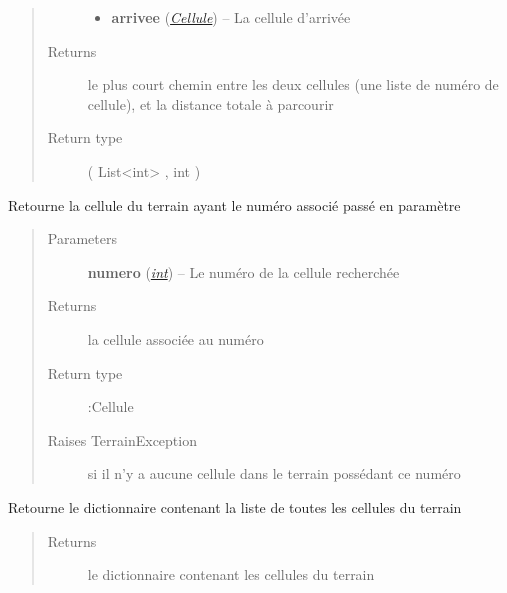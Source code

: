 \documentclass[letterpaper,10pt,english]{sphinxmanual}
\begin{document}
\begin{fulllineitems}
\begin{fulllineitems}
\begin{quote}
\begin{description}
\begin{itemize}
\item {} 
\textbf{arrivee} ({\hyperref[index:module-Cellule]{\emph{Cellule}}}) -- La cellule d'arrivée

\end{itemize}

\item[{Returns}] \leavevmode
le plus court chemin entre les deux cellules (une liste de numéro de cellule), et la distance totale à parcourir

\item[{Return type}] \leavevmode
( List\textless{}int\textgreater{} , int )

\end{description}\end{quote}

\end{fulllineitems}


\begin{fulllineitems}
\label{index:Terrain.Terrain.getCellule}
Retourne la cellule du terrain ayant le numéro associé passé en paramètre
\begin{quote}\begin{description}
\item[{Parameters}] \leavevmode
\textbf{numero} (\href{http://docs.python.org/library/functions.html\#int}{\emph{int}}) -- Le numéro de la cellule recherchée

\item[{Returns}] \leavevmode
la cellule associée au numéro

\item[{Return type}] \leavevmode
:Cellule

\item[{Raises TerrainException}] \leavevmode
si il n'y a aucune cellule dans le terrain possédant ce numéro

\end{description}\end{quote}

\end{fulllineitems}


\begin{fulllineitems}
\label{index:Terrain.Terrain.getCellules}
Retourne le dictionnaire contenant la liste de toutes les cellules du terrain
\begin{quote}\begin{description}
\item[{Returns}] \leavevmode
le dictionnaire contenant les cellules du terrain


\end{description}
\end{quote}
\end{fulllineitems}
\end{fulllineitems}
\end{document}
